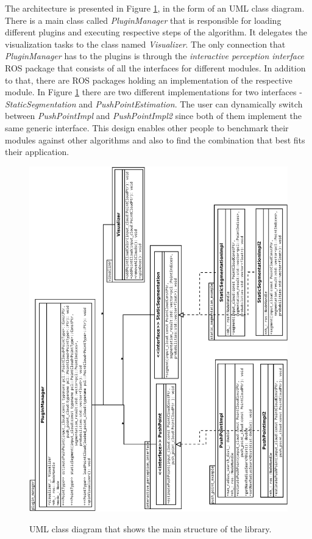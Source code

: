 The architecture is presented in Figure \ref{fig:uml}, in the form of an UML class diagram. There is a main class called \textit{PluginManager} that is responsible for loading different plugins and executing respective steps of the algorithm. It delegates the visualization tasks to the class named \textit{Visualizer}. The only connection that \textit{PluginManager} has to the plugins is through the \textit{interactive perception interface} ROS package that consists of all the interfaces for different modules. In addition to that, there are ROS packages holding an implementation of the respective module. In Figure \ref{fig:uml} there are two different implementations for two interfaces - \textit{StaticSegmentation} and \textit{PushPointEstimation}. The user can dynamically switch between \textit{PushPointImpl} and \textit{PushPointImpl2} since both of them implement the same generic interface. This design enables other people to benchmark their modules against other algorithms and also to find the combination that best fits their application.  

\begin{figure}
{\includegraphics[width=0.9\columnwidth, angle=-90]{figures/uml-after.pdf}}

\caption{UML class diagram that shows the main structure of the library.}
\label{fig:uml}
\end{figure}




